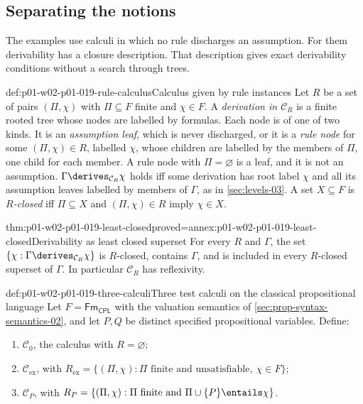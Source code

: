 \subsection{Separating the notions}
\label{sec:p01-w02-p01-019-separations}

The examples use calculi in which no rule discharges an assumption. For them
derivability has a closure description. That description gives exact
derivability conditions without a search through trees.

\begin{hbdefinition}{def:p01-w02-p01-019-rule-calculus}{Calculus given by rule instances}
Let \(R\) be a set of pairs \((\Pi,\chi)\) with \(\Pi\subseteq F\) finite and
\(\chi\in F\). A \emph{derivation in \(\mathcal C_R\)} is a finite rooted tree
whose nodes are labelled by formulas. Each node is of one of two kinds.
It is an \emph{assumption leaf}, which is never discharged, or it is a
\emph{rule node} for some \((\Pi,\chi)\in R\), labelled \(\chi\), whose
children are labelled by the members of \(\Pi\), one child for each member.
A rule node with \(\Pi=\varnothing\) is a leaf, and it is not an assumption.
\(\Gamma\derives_{\mathcal C_R}\chi\) holds iff some derivation has root
label \(\chi\) and all its assumption leaves labelled by members of
\(\Gamma\), as in \cref{sec:levels-03}. A set \(X\subseteq F\) is
\emph{\(R\)-closed} iff \(\Pi\subseteq X\) and \((\Pi,\chi)\in R\) imply
\(\chi\in X\).
\end{hbdefinition}

\begin{hblemma}{thm:p01-w02-p01-019-least-closed}{proved=annex:p01-w02-p01-019-least-closed}{Derivability as least closed superset}
For every \(R\) and \(\Gamma\), the set
\(\{\chi:\Gamma\derives_{\mathcal C_R}\chi\}\) is \(R\)-closed, contains
\(\Gamma\), and is included in every \(R\)-closed superset of \(\Gamma\). In
particular \(\mathcal C_R\) has reflexivity.
\end{hblemma}

\begin{hbdefinition}{def:p01-w02-p01-019-three-calculi}{Three test calculi on the classical propositional language}
Let \(F=\mathsf{Fm}_{\mathsf{CPL}}\) with the valuation semantics of
\cref{sec:prop-syntax-semantics-02}, and let \(P,Q\) be distinct specified
propositional variables. Define:
\begin{enumerate}
  \item \(\mathcal C_0\), the calculus with \(R=\varnothing\);
  \item \(\mathcal C_{\mathrm{ex}}\), with
        \(R_{\mathrm{ex}}=\{(\Pi,\chi):\Pi\text{ finite and unsatisfiable},\
        \chi\in F\}\);
  \item \(\mathcal C_P\), with
        \(R_P=\{(\Pi,\chi):\Pi\text{ finite and }\Pi\cup\{P\}\entails\chi\}\).
\end{enumerate}
\end{hbdefinition}

